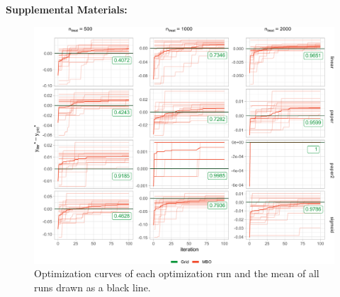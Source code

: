 \documentclass[bimj,fleqn]{w-art}
\theoremstyle{plain}
\theoremstyle{definition}
\begin{document}





\newpage
\phantom{aaaa}
\clearpage
\begin{center}
\textbf{\large Supplemental Materials: \newtitle}
\end{center}
\FloatBarrier
\setcounter{equation}{0}
\setcounter{figure}{0}
\setcounter{table}{0}
\setcounter{page}{1}
\makeatletter
\renewcommand{\theequation}{S\arabic{equation}}
\renewcommand{\thefigure}{S\arabic{figure}}
\renewcommand{\thetable}{S\arabic{table}}
\renewcommand{\bibnumfmt}[1]{[S#1]}



\begin{figure}[htb]
\centering
\includegraphics[width=\linewidth]{generated/figures/plot_opt_path.pdf}
\caption{%
  Optimization curves of each optimization run and the mean of all runs drawn as a black line.
  }
\label{fig:plot_opt_path} 
\end{figure}
\end{document}
